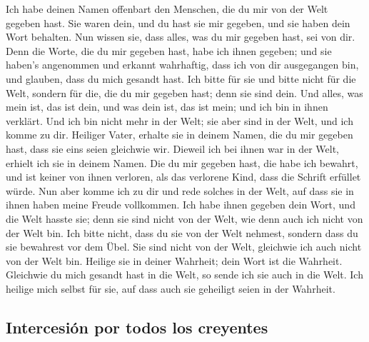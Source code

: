  Ich habe deinen Namen offenbart den Menschen, die du mir
von der Welt gegeben hast. Sie waren dein, und du hast sie mir gegeben,
und sie haben dein Wort behalten.  Nun wissen sie, dass
alles, was du mir gegeben hast, sei von dir.  Denn die
Worte, die du mir gegeben hast, habe ich ihnen gegeben; und sie haben's
angenommen und erkannt wahrhaftig, dass ich von dir ausgegangen bin, und
glauben, dass du mich gesandt hast.  Ich bitte für sie und
bitte nicht für die Welt, sondern für die, die du mir gegeben hast; denn
sie sind dein.  Und alles, was mein ist, das ist dein,
und was dein ist, das ist mein; und ich bin in ihnen verklärt.
 Und ich bin nicht mehr in der Welt; sie aber sind in der
Welt, und ich komme zu dir. Heiliger Vater, erhalte sie in deinem Namen,
die du mir gegeben hast, dass sie eins seien gleichwie wir.
 Dieweil ich bei ihnen war in der Welt, erhielt ich sie
in deinem Namen. Die du mir gegeben hast, die habe ich bewahrt, und ist
keiner von ihnen verloren, als das verlorene Kind, dass die Schrift
erfüllet würde.  Nun aber komme ich zu dir und rede
solches in der Welt, auf dass sie in ihnen haben meine Freude
vollkommen.  Ich habe ihnen gegeben dein Wort, und die
Welt hasste sie; denn sie sind nicht von der Welt, wie denn auch ich
nicht von der Welt bin.  Ich bitte nicht, dass du sie von
der Welt nehmest, sondern dass du sie bewahrest vor dem Übel.
 Sie sind nicht von der Welt, gleichwie ich auch nicht
von der Welt bin.  Heilige sie in deiner Wahrheit; dein
Wort ist die Wahrheit.  Gleichwie du mich gesandt hast in
die Welt, so sende ich sie auch in die Welt.  Ich heilige
mich selbst für sie, auf dass auch sie geheiligt seien in der Wahrheit.

\hypertarget{intercesiuxf3n-por-todos-los-creyentes}{%
\subsection{Intercesión por todos los
creyentes}\label{intercesiuxf3n-por-todos-los-creyentes}}

